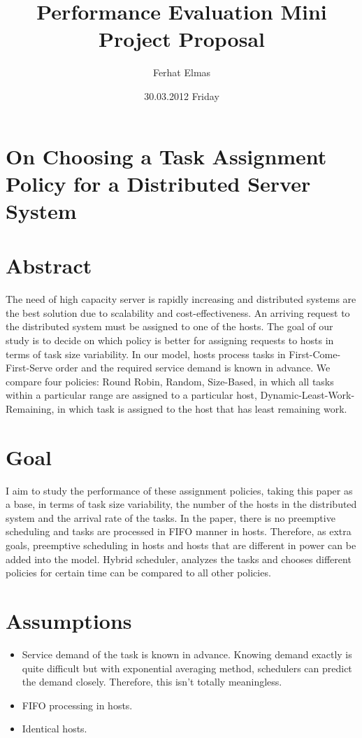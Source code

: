 \documentclass[11pt]{article}
\begin{document}
\title{\textbf{Performance Evaluation Mini Project Proposal}}
\author{Ferhat Elmas}
\date{30.03.2012 Friday}
\maketitle

\begin{center}
\section*{On Choosing a Task Assignment Policy for a Distributed Server System}

\section*{Abstract}
\end{center}
The need of high capacity server is rapidly increasing and distributed systems are the best solution due to scalability and cost-effectiveness. An arriving request to the distributed system must be assigned to one of the hosts. The goal of our study is to decide on which policy is better for assigning requests to hosts in terms of task size variability. In our model, hosts process tasks in First-Come-First-Serve order and the required service demand is known in advance. We compare four policies: Round Robin, Random, Size-Based, in which all tasks within a particular range are assigned to a particular host, Dynamic-Least-Work-Remaining, in which task is assigned to the host that has least remaining work.

\section*{Goal}
I aim to study the performance of these assignment policies, taking this paper as a base, in terms of task size variability, the number of the hosts in the distributed system and the arrival rate of the tasks. In the paper, there is no preemptive scheduling and tasks are processed in FIFO manner in hosts. Therefore, as extra goals, preemptive scheduling in hosts and hosts that are different in power can be added into the model. Hybrid scheduler, analyzes the tasks and chooses different policies for certain time can be compared to all other policies.

\section*{Assumptions}
\begin{itemize}
	\item Service demand of the task is known in advance. Knowing demand exactly is quite difficult but with exponential averaging method, schedulers can predict the demand closely. Therefore, this isn't totally meaningless.
	\item FIFO processing in hosts.
	\item Identical hosts.
\end{itemize}   
\end{document}
